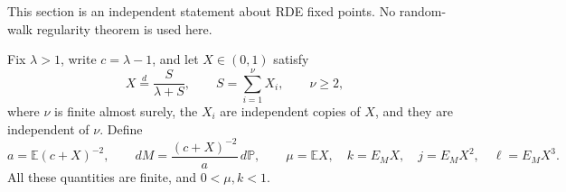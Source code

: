 \documentclass[11pt,a4paper]{article}
\numberwithin{equation}{section}
\theoremstyle{plain}
\theoremstyle{definition}
\theoremstyle{remark}
\newcommand{\E}{\mathbb E}
\newcommand{\Prob}{\mathbb P}
\begin{document}
This section is an independent statement about RDE fixed points.  No
random-walk regularity theorem is used here.

Fix $\lambda>1$, write $c=\lambda-1$, and let $X\in(0,1)$ satisfy
\begin{equation}\label{eq:abstract-rde}
 X\overset d=\frac{S}{\lambda+S},\qquad
 S=\sum_{i=1}^{\nu}X_i,\qquad \nu\ge2,
\end{equation}
where $\nu$ is finite almost surely, the $X_i$ are independent copies of
$X$, and they are independent of $\nu$.  Define
\begin{equation}\label{eq:tilted-moments}
 a=\E(c+X)^{-2},\qquad
 dM=\frac{(c+X)^{-2}}a\,d\Prob,
 \qquad
 \mu=\E X,\quad k=E_MX,\quad j=E_MX^2,\quad \ell=E_MX^3.
\end{equation}
All these quantities are finite, and $0<\mu,k<1$.
\end{document}
